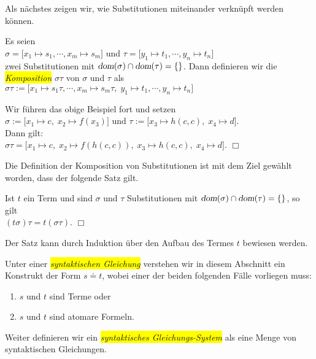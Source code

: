 \noindent
Als n\"{a}chstes zeigen wir, wie  Substitutionen miteinander verkn\"{u}pft werden k\"{o}nnen.
\begin{Definition} 
    Es seien\\[0.2cm]
    \hspace*{1.3cm}  $\sigma = \big[ x_1 \mapsto s_1, \cdots, x_m \mapsto s_m \big]$ \quad und \quad  $\tau = \big[ y_1 \mapsto t_1, \cdots, y_n \mapsto t_n \big]$ \\[0.2cm]
    zwei Substitutionen mit $\textsl{dom}(\sigma) \cap \textsl{dom}(\tau) = \{\}$. Dann definieren
    wir die \colorbox{yellow}{\emph{Komposition}} $\sigma\tau$ von $\sigma$ und $\tau$ als \\[0.2cm]
    \hspace*{1.3cm} $\sigma\tau := \big[ x_1 \mapsto s_1\tau, \cdots, x_m \mapsto s_m\tau,\; y_1 \mapsto t_1, \cdots, y_n \mapsto t_n \big]$
    \eox
\end{Definition}

\example
Wir f\"{u}hren das obige Beispiel fort und setzen \\[0.2cm]
\hspace*{1.3cm} $\sigma := \big[ x_1 \mapsto c,\; x_2 \mapsto f(x_3) \big]$
                \quad und \quad $\tau := \big[ x_3 \mapsto h(c,c),\; x_4 \mapsto d \big]$. \\[0.2cm]
Dann gilt: \\[0.2cm]
\hspace*{1.3cm} $ \sigma\tau = \big[ x_1 \mapsto c,\; x_2 \mapsto f(h(c,c)),\; x_3 \mapsto h(c,c),\;x_4 \mapsto d \big]$.
\hspace*{\fill} $\Box$
\vspace{0.3cm}

\noindent
Die Definition der Komposition von Substitutionen ist mit dem Ziel gew\"{a}hlt worden, dass
der folgende Satz gilt.
\begin{Satz} \label{satz:komposition}
    Ist $t$ ein Term und sind $\sigma$ und $\tau$ Substitutionen mit 
    $\textsl{dom}(\sigma) \cap \textsl{dom}(\tau) = \{\}$, so gilt \\[0.2cm]
    \hspace*{1.3cm} $(t \sigma)\tau = t (\sigma\tau)$.
    \hspace*{\fill} $\Box$
\end{Satz}
Der Satz kann durch Induktion \"{u}ber den Aufbau des Termes $t$ bewiesen werden.


\begin{Definition}
Unter einer \colorbox{yellow}{\emph{syntaktischen Gleichung}} verstehen wir in diesem Abschnitt ein Konstrukt der Form
$s \doteq t$, wobei einer der beiden folgenden F\"{a}lle vorliegen muss:
\begin{enumerate}
\item $s$ und $t$ sind Terme  oder
\item $s$ und $t$ sind atomare Formeln.
\end{enumerate}
Weiter definieren wir ein \colorbox{yellow}{\emph{syntaktisches Gleichungs-System}} als eine Menge
von syntaktischen Gleichungen.
\eox
\end{Definition}

